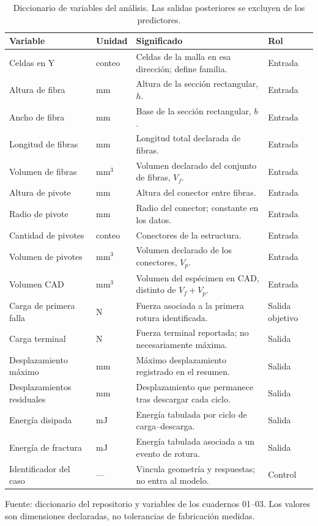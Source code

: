 \begin{table}[htbp]
\centering\small{}
\caption{Diccionario de variables del análisis. Las salidas posteriores se excluyen de los predictores.}
\label{tab:diccionario}
\begin{tabularx}{\linewidth}{@{}p{3.3cm}lYl@{}}
\toprule
Variable & Unidad & Significado & Rol \\
\midrule
Celdas en Y & conteo & Celdas de la malla en esa dirección; define familia. & Entrada \\
Altura de fibra & mm & Altura de la sección rectangular, $h$. & Entrada \\
Ancho de fibra & mm & Base de la sección rectangular, $b$. & Entrada \\
Longitud de fibras & mm & Longitud total declarada de fibras. & Entrada \\
Volumen de fibras & mm$^3$ & Volumen declarado del conjunto de fibras, $V_f$. & Entrada \\
Altura de pivote & mm & Altura del conector entre fibras. & Entrada \\
Radio de pivote & mm & Radio del conector; constante en los datos. & Entrada \\
Cantidad de pivotes & conteo & Conectores de la estructura. & Entrada \\
Volumen de pivotes & mm$^3$ & Volumen declarado de los conectores, $V_p$. & Entrada \\
Volumen CAD & mm$^3$ & Volumen del espécimen en CAD, distinto de $V_f+V_p$. & Entrada \\
\midrule
Carga de primera falla & N & Fuerza asociada a la primera rotura identificada. & Salida objetivo \\
Carga terminal & N & Fuerza terminal reportada; no necesariamente máxima. & Salida \\
Desplazamiento máximo & mm & Máximo desplazamiento registrado en el resumen. & Salida \\
Desplazamientos residuales & mm & Desplazamiento que permanece tras descargar cada ciclo. & Salida \\
Energía disipada & mJ & Energía tabulada por ciclo de carga--descarga. & Salida \\
Energía de fractura & mJ & Energía tabulada asociada a un evento de rotura. & Salida \\
\midrule
Identificador del caso & --- & Vincula geometría y respuestas; no entra al modelo. & Control \\
\bottomrule
\end{tabularx}
\par\smallskip\small Fuente: diccionario del repositorio y variables de los cuadernos 01--03. Los valores son dimensiones declaradas, no tolerancias de fabricación medidas.
\end{table}
